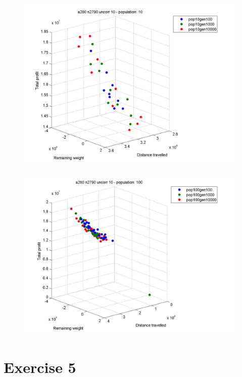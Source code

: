 \documentclass[a4paper,12pt]{article}
\begin{document}
\begin{figure}[h]
\centering
\begin{minipage}{.5\textwidth}
  \centering
  \includegraphics[width=.8\linewidth]{q4graphs/a280_n2790_pop10.png}
  \label{fig:a280279010}
\end{minipage}%
\begin{minipage}{.5\textwidth}
  \centering
  \includegraphics[width=.8\linewidth]{q4graphs/a280_n2790_pop100.png}
  \label{fig:a280279010}
\end{minipage}
\end{figure}

\paragraph{ }

\newpage
\section*{Exercise 5}
\end{document}
